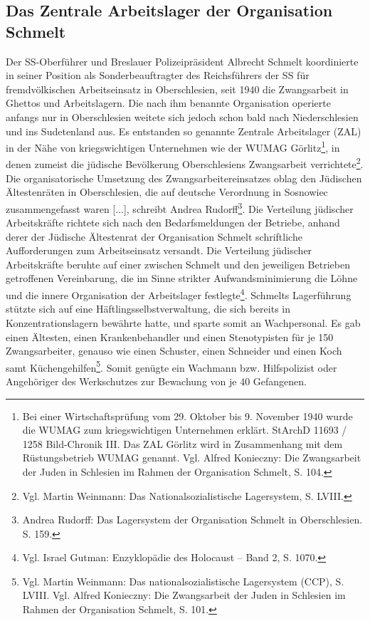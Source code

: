 \documentclass[a4paper,12pt,ngerman,
]{nisebook}
\begin{document}
\subsection{Das Zentrale Arbeitslager der Organisation Schmelt}
Der SS-Oberführer und Breslauer Polizeipräsident Albrecht Schmelt koordinierte in seiner Position als \glqq Sonderbeauftragter des Reichsführers der SS für fremdvölkischen Arbeitseinsatz in Oberschlesien\grqq, seit 1940 die Zwangsarbeit in Ghettos und Arbeitslagern. Die nach ihm benannte Organisation operierte anfangs nur in Oberschlesien weitete sich jedoch schon bald nach Niederschlesien und ins Sudetenland aus. Es entstanden so genannte Zentrale Arbeitslager (ZAL) in der Nähe von kriegswichtigen Unternehmen wie der WUMAG Görlitz\footnote{Bei einer Wirtschaftsprüfung vom 29. Oktober bis 9. November 1940 wurde die WUMAG zum kriegswichtigen Unternehmen erklärt. StArchD 11693 / 1258 Bild-Chronik III. Das ZAL Görlitz wird in Zusammenhang mit dem Rüstungsbetrieb WUMAG genannt. Vgl. Alfred Konieczny: Die Zwangsarbeit der Juden in Schlesien im Rahmen der Organisation Schmelt, S. 104.}, in denen zumeist die jüdische Bevölkerung Oberschlesiens Zwangsarbeit verrichtete\footnote{Vgl. Martin Weinmann: Das Nationalsozialistische Lagersystem, S. LVIII.}. \glqq Die organisatorische Umsetzung des Zwangsarbeitereinsatzes oblag den Jüdischen Ältestenräten in Oberschlesien, die auf deutsche Verordnung in Sosnowiec zusammengefasst waren [...]\grqq, schreibt Andrea Rudorff\footnote{Andrea Rudorff: Das Lagersystem der Organisation Schmelt in Oberschlesien. S. 159.}. Die Verteilung jüdischer Arbeitskräfte richtete sich nach den Bedarfsmeldungen der Betriebe, anhand derer der Jüdische Ältestenrat der Organisation Schmelt schriftliche Aufforderungen zum Arbeitseinsatz versandt. Die Verteilung jüdischer Arbeitskräfte beruhte auf einer zwischen Schmelt und den jeweiligen Betrieben getroffenen Vereinbarung, die im Sinne strikter Aufwandsminimierung die Löhne und die innere Organisation der Arbeitslager festlegte\footnote{Vgl. Israel Gutman: Enzyklopädie des Holocaust -- Band 2, S. 1070.}. Schmelts Lagerführung stützte sich auf eine Häftlingsselbstverwaltung, die sich bereits in Konzentrationslagern bewährte hatte, und sparte somit an Wachpersonal. Es gab einen Ältesten, einen Krankenbehandler und einen Stenotypisten für je 150 Zwangsarbeiter, genauso wie einen Schuster, einen Schneider und einen Koch samt Küchengehilfen\footnote{Vgl. Martin Weinmann: Das nationalsozialistische Lagersystem (CCP), S. LVIII. Vgl. Alfred Konieczny: Die Zwangsarbeit der Juden in Schlesien im Rahmen der Organisation Schmelt, S. 101.}. Somit genügte ein Wachmann bzw. Hilfspolizist oder Angehöriger des Werkschutzes zur Bewachung von je 40 Gefangenen.
\end{document}
